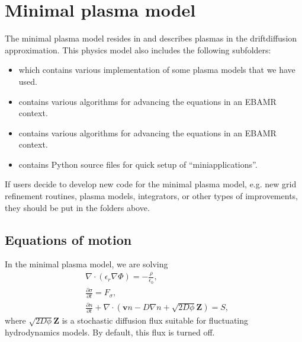 \documentclass[letterpaper,10pt,english]{sphinxmanual}
\begin{document}
\section{Minimal plasma model}
\label{\detokenize{MinimalPlasmaModel:minimal-plasma-model}}\label{\detokenize{MinimalPlasmaModel:chap-minimalplasmamodel}}\label{\detokenize{MinimalPlasmaModel::doc}}
The minimal plasma model resides in  and describes plasmas in the drift\sphinxhyphen{}diffusion approximation.
This physics model also includes the following subfolders:
\begin{itemize}
\item {} 
 which contains various implementation of some plasma models that we have used.

\item {} 
 contains various algorithms for advancing the equations in an EBAMR context.

\item {} 
 contains various algorithms for advancing the equations in an EBAMR context.

\item {} 
 contains Python source files for quick setup of “mini\sphinxhyphen{}applications”.

\end{itemize}

If users decide to develop new code for the minimal plasma model, e.g. new grid refinement routines, plasma models, integrators, or other types of improvements, they should be put in the folders above.


\subsection{Equations of motion}
\label{\detokenize{MinimalPlasmaModel:equations-of-motion}}
In the minimal plasma model, we are solving
\begin{align}
&\nabla\cdot\left(\epsilon_r\nabla\Phi\right) = -\frac{\rho}{\epsilon_0}, \\[1ex]
&\frac{\partial\sigma}{\partial t} = F_\sigma,\\[1ex]
&\frac{\partial n}{\partial t} + \nabla\cdot\left(\mathbf{v} n - D\nabla n + \sqrt{2D\phi}\mathbf{Z}\right) = S,
\end{align}
where \(\sqrt{2D\phi}\mathbf{Z}\) is a stochastic diffusion flux suitable for fluctuating hydrodynamics models.
By default, this flux is turned off.
\end{document}
